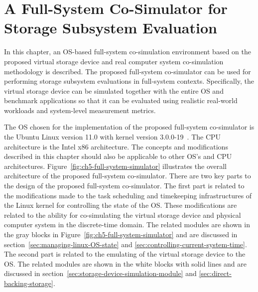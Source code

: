 \chapter{A Full-System Co-Simulator for Storage Subsystem Evaluation}
\label{ch:5}

In this chapter, an OS-based full-system co-simulation environment based on the proposed virtual storage device and real computer system co-simulation methodology is described. The proposed full-system co-simulator can be used for performing storage subsystem evaluations in full-system contexts. Specifically, the virtual storage device can be simulated together with the entire OS and benchmark applications so that it can be evaluated using realistic real-world workloads and system-level measurement metrics.

The OS chosen for the implementation of the proposed full-system co-simulator is the Ubuntu Linux version 11.0 with kernel version 3.0.0-19~\cite{Ubuntu:2013}. The CPU architecture is the Intel x86 architecture. The concepts and modifications described in this chapter should also be applicable to other OS's and CPU architectures. Figure~\ref{fig:ch5-full-system-simulator} illustrates the overall architecture of the proposed full-system co-simulator. There are two key parts to the design of the proposed full-system co-simulator. The first part is related to the modifications made to the task scheduling and timekeeping infrastructures of the Linux kernel for controlling the state of the OS. These modifications are related to the ability for co-simulating the virtual storage device and physical computer system in the discrete-time domain. The related modules are shown in the gray blocks in Figure~\ref{fig:ch5-full-system-simulator} and are discussed in section~\ref{sec:managing-linux-OS-state} and \ref{sec:controlling-current-system-time}. The second part is related to the emulating of the virtual storage device to the OS. The related modules are shown in the white blocks with solid lines and are discussed in section~\ref{sec:storage-device-simulation-module} and \ref{sec:direct-backing-storage}.

